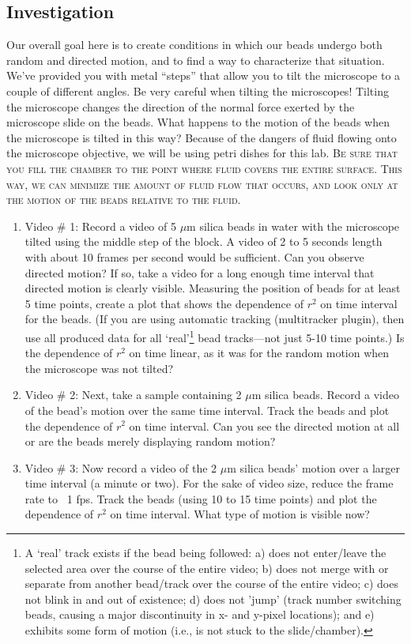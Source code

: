 \subsection*{Investigation}
Our overall goal here is to create conditions in which our beads undergo both random and directed motion, and to find a way to characterize that situation. 
We've provided you with metal ``steps'' that allow you to tilt the microscope to a couple of different angles. 
Be very careful when tilting the microscopes! 
Tilting the microscope changes the direction of the normal force exerted by the microscope slide on the beads. 
What happens to the motion of the beads when the microscope is tilted in this way? 
Because of the dangers of fluid flowing onto the microscope objective, we will be using petri dishes for this lab. 
\textsc{Be sure that you fill the chamber to the point where fluid covers the entire surface.
This way, we can minimize the amount of fluid flow that occurs, and look only at the motion of the beads relative to the fluid.}
\begin{enumerate}
\item Video \# 1: Record a video of 5 $\mu$m silica beads in water with the microscope tilted using the middle step of the block. A video of 2 to 5 seconds length with about 10 frames per second would be sufficient. Can you observe directed motion? If so, take a video for a long enough time interval that directed motion is clearly visible. Measuring the position of beads for at least 5 time points, create a plot that shows the dependence of $r^{2}$ on time interval for the beads. (If you are using automatic tracking (multitracker plugin), then use all produced data for all `real'\footnote{
A `real' track exists if the bead being followed: a) does not enter/leave the selected area over the course of the entire video; b) does not merge with or separate from another bead/track over the course of the entire video; c) does not blink in and out of existence; d) does not 'jump' (track number switching beads, causing a major discontinuity in x- and y-pixel locations); and e) exhibits some form of motion (i.e., is not stuck to the slide/chamber).} 
bead tracks—not just 5-10 time points.) Is the dependence of $r^{2}$ on time linear, as it was for the random motion when the microscope was not tilted?
\item Video \# 2: Next, take a sample containing 2 $\mu$m silica beads. Record a video of the bead's motion over the same time interval. Track the beads and plot the dependence of $r^{2}$ on time interval. Can you see the directed motion at all or are the beads merely displaying random motion?
\item Video \# 3: Now record a video of the 2 $\mu$m silica beads' motion over a larger time interval (a minute or two). For the sake of video size, reduce the frame rate to ~1 fps. Track the beads (using 10 to 15 time points) and plot the dependence of $r^{2}$ on time interval. What type of motion is visible now?
\end{enumerate}
